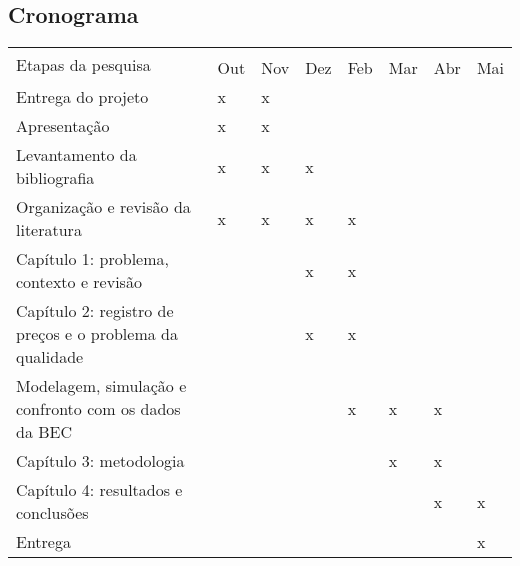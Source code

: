 \subsection{Cronograma}

\begin{table}[]
\begin{tabular}{@{}llllllll@{}}
\toprule
\multirow{2}{*}{Etapas da pesquisa}                              &     &     &     &     &     &     &     \\ \cmidrule(l){2-8} 
                                                                 & Out & Nov & Dez & Feb & Mar & Abr & Mai \\ \cmidrule(r){1-1}
Entrega do projeto                                               & x   & x   &     &     &     &     &     \\
Apresentação                                                     & x   & x   &     &     &     &     &     \\
Levantamento da bibliografia                                     & x   & x   & x   &     &     &     &     \\
Organização e revisão da literatura                              & x   & x   & x   & x   &     &     &     \\
Capítulo 1: problema, contexto e revisão                         &     &     & x   & x   &     &     &     \\
Capítulo 2: registro de preços e o problema da qualidade         &     &     & x   & x   &     &     &     \\
Modelagem, simulação e confronto com os dados da BEC             &     &     &     & x   & x   & x   &     \\
Capítulo 3: metodologia                                          &     &     &     &     & x   & x   &     \\
Capítulo 4: resultados e conclusões                              &     &     &     &     &     & x   & x   \\
Entrega                                                          &     &     &     &     &     &     & x   \\ \bottomrule
\end{tabular}
\end{table}